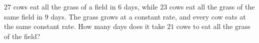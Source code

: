 $27$ cows eat all the grass of a field in $6$ days, while $23$ cows eat all the grass of the same field in $9$ days. The grass grows at a constant rate, and every cow eats at the same constant rate. How many days does it take $21$ cows to eat all the grass of the field?
